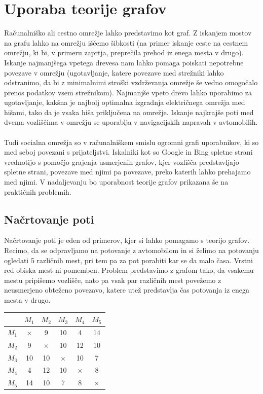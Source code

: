 \documentclass[11pt]{article}
\begin{document}
\section{Uporaba teorije grafov}

Računalniško ali cestno omrežje lahko predstavimo kot graf. Z iskanjem mostov na grafu lahko na omrežju iščemo šibkosti (na primer iskanje ceste na cestnem omrežju, ki bi, v primeru zaprtja, preprečila prehod iz enega mesta v drugo). Iskanje najmanjšega vpetega drevesa nam lahko pomaga poiskati nepotrebne povezave v omrežju (ugotavljanje, katere povezave med strežniki lahko odstranimo, da bi z minimalnimi stroški vzdrževanja omrežje še vedno omogočalo prenos podatkov vsem strežnikom). Najmanjše vpeto drevo lahko uporabimo za ugotavljanje, kakšna je najbolj optimalna izgradnja električnega omrežja med hišami, tako da je vsaka hiša priključena na omrežje. Iskanje najkrajše poti med dvema vozliščima v omrežju se uporablja v navigacijskih napravah v avtomobilih. 
\\ \\
Tudi socialna omrežja so v računalniškem smislu ogromni grafi uporabnikov, ki so med seboj povezani s prijateljstvi. Iskalniki kot so Google in Bing spletne strani vrednotijo s pomočjo grajenja usmerjenih grafov, kjer vozlišča predstavljajo spletne strani, povezave med njimi pa povezave, preko katerih lahko prehajamo med njimi. V nadaljevanju bo uporabnost teorije grafov prikazana še na praktičnih problemih.

\subsection{Načrtovanje poti}

Načrtovanje poti je eden od primerov, kjer si lahko pomagamo s teorijo grafov. Recimo, da se odpravljamo na potovanje z avtomobilom in si želimo na potovanju ogledati 5 različnih mest, pri tem pa za pot porabiti kar se da malo časa. Vrstni red obiska mest ni pomemben. Problem predstavimo z grafom tako, da vsakemu mestu pripišemo vozlišče, nato pa vsak par različnih mest povežemo z neusmerjeno obteženo povezavo, katere utež predstavlja čas potovanja iz enega mesta v drugo.

\begin{center}

\begin{tabular}{ c | c c c c c }
	
	 & $M_1$ & $M_2$ & $M_3$ & $M_4$ & $M_5$ \\ 
	\hline 
 	$M_1$ & $\times$ & 9 & 10 & 4 & 14 \\
 	$M_2$ & 9 & $\times$ & 10 & 12 & 10\\
 	$M_3$ & 10 & 10 & $\times$ & 10 & 7 \\
 	$M_4$ & 4 & 12 & 10 & $\times$ & 8\\
 	$M_5$ & 14 & 10 & 7 & 8 & $\times$ \\

\end{tabular}

\end{center}
\end{document}
